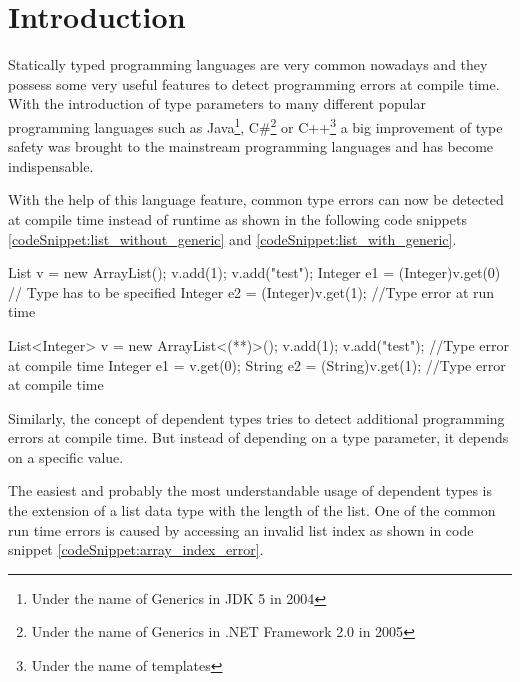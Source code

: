 \section{Introduction}\label{section:introduction}
Statically typed programming languages are very common nowadays and they possess some very useful features to detect programming errors at compile time.
With the introduction of type parameters to many different popular programming languages such as Java\footnote{Under the name of Generics in JDK 5 in 2004\cite{JDK5}},
 C\#\footnote{Under the name of Generics in .NET Framework 2.0 in 2005\cite{dotnet20}} or C++\footnote{Under the name of templates} a big improvement of type safety was brought to the mainstream programming languages and has become indispensable.

With the help of this language feature, common type errors can now be detected at compile time instead of runtime as shown in the following code snippets \ref{codeSnippet:list_without_generic} and \ref{codeSnippet:list_with_generic}.

\begin{adjustbox}{width=\columnwidth}
\begin{codesnippet}[caption={List without generic argument}, label={codeSnippet:list_without_generic}]
List v = new ArrayList();
v.add(1);
v.add("test");
Integer e1 = (Integer)v.get(0) // Type has to be specified
Integer e2 = (Integer)v.get(1); //Type error at run time
\end{codesnippet}
\end{adjustbox}
\begin{adjustbox}{width=\columnwidth}
\begin{codesnippet}[escapeinside={(*}{*)}, caption={List with type argument}, label={codeSnippet:list_with_generic}]
List<Integer> v = new ArrayList<(**)>();
v.add(1);
v.add("test"); //Type error at compile time
Integer e1 = v.get(0);
String e2 = (String)v.get(1); //Type error at compile time
\end{codesnippet}
\end{adjustbox}

Similarly, the concept of dependent types tries to detect additional programming errors at compile time. But instead of depending on a type parameter, it depends on a specific value. 

The easiest and probably the most understandable usage of dependent types is the extension of a list data type with the length of the list. 
One of the common run time errors is caused by accessing an invalid list index as shown in code snippet \ref{codeSnippet:array_index_error}.

